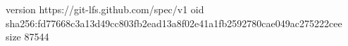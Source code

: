 version https://git-lfs.github.com/spec/v1
oid sha256:fd77668c3a13d49cc803fb2ead13a8f02e41a1fb2592780cae049ac275222cee
size 87544
